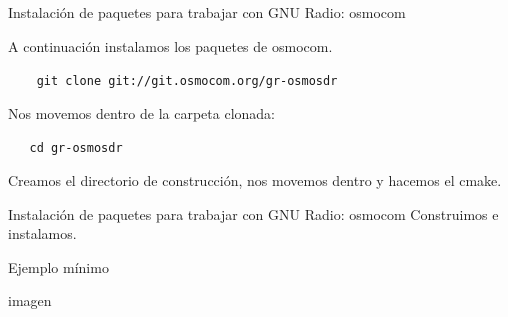 \begin{frame}{Instalación de paquetes para trabajar con GNU Radio: osmocom}

A continuación instalamos los paquetes de osmocom.

\begin{block}{}
    \texttt{
    \ \ \ git clone git://git.osmocom.org/gr-osmosdr}
\end{block}

Nos movemos dentro de la carpeta clonada:

\begin{block}{}
    \texttt
    {\ \ \ cd gr-osmosdr}
\end{block}


Creamos el directorio de construcción, nos movemos dentro y hacemos el cmake.

\end{frame}

\begin{frame}{Instalación de paquetes para trabajar con GNU Radio: osmocom}
Construimos e instalamos.


\end{frame}

\begin{frame}{Ejemplo mínimo}
    \begin{center}
    \vspace{-0.3cm}
    imagen
    \end{center}
\end{frame}




